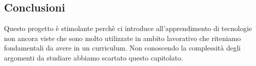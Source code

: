     \subsection{Conclusioni}
    	Questo progetto è stimolante perchè ci introduce all'apprendimento di tecnologie non ancora viste che sono molto utilizzate in ambito lavorativo che riteniamo fondamentali da avere in un curriculum.
    	Non conoscendo la complessità degli argomenti da studiare abbiamo scartato questo capitolato. 